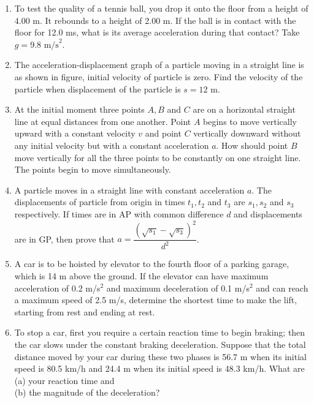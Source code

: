 \documentclass{article}
\renewcommand{\frac}[2]{\dfrac{#1}{#2}}
\begin{document}
\begin{enumerate}
    \item To test the quality of a tennis ball, you drop it onto the floor from a height of 4.00 m. It rebounds to a height of 2.00 m. If the ball is in contact with the floor for 12.0 ms, what is its average acceleration during that contact? Take \( g = 9.8 \text{ m/s}^2 \).
    
    \item The acceleration-displacement graph of a particle moving in a straight line is as shown in figure, initial velocity of particle is zero. Find the velocity of the particle when displacement of the particle is \( s = 12 \text{ m} \).
    \begin{center}
    \end{center}
    
    \item At the initial moment three points \( A, B \) and \( C \) are on a horizontal straight line at equal distances from one another. Point \( A \) begins to move vertically upward with a constant velocity \( v \) and point \( C \) vertically downward without any initial velocity but with a constant acceleration \( a \). How should point \(
B \) move vertically for all the three points to be constantly on one straight line. The points begin to move simultaneously.
    
    \item A particle moves in a straight line with constant acceleration \( a \). The displacements of particle from origin in times \( t_1, t_2 \) and \( t_3 \) are \( s_1, s_2 \) and \( s_3 \) respectively. If times are in AP with common difference \( d \) and displacements are in GP, then prove that \( a = \frac{\left( \sqrt{s_1} - \sqrt{s_3}
\right)^2}{d^2} \).
    
    \item A car is to be hoisted by elevator to the fourth floor of a parking garage, which is 14 m above the ground. If the elevator can have maximum acceleration of 0.2 m/s\(^2\) and maximum deceleration of 0.1 m/s\(^2\) and can reach a maximum speed of 2.5 m/s, determine the shortest time to make the lift, starting from rest and ending at 
rest.
    
    \item To stop a car, first you require a certain reaction time to begin braking; then the car slows under the constant braking deceleration. Suppose that the total distance moved by your car during these two phases is 56.7 m when its initial speed is 80.5 km/h and 24.4 m when its initial speed is 48.3 km/h. What are \\
    (a) your reaction time and \\
    (b) the magnitude of the deceleration?


\end{enumerate}
\end{document}
